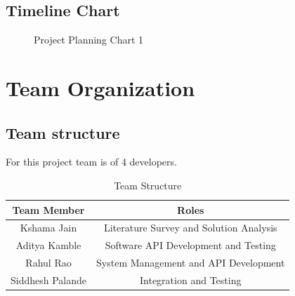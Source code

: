 \documentclass[oneside,a4paper,12pt]{report}
\begin{document}
\pagebreak
\subsection{Timeline Chart}  
\begin{center}
	\begin{figure}[!htbp]
		\centering
	  \caption{Project Planning Chart 1}
	  \label{fig:usecase}
	\end{figure}
\end{center}
 
\section{Team Organization}

\subsection{Team structure}
For this project team is of 4 developers. 
\begin{table}[!htbp]
\begin{center}
\def\arraystretch{1.5}
  \begin{tabular}{| c | c |}
       \hline
       
Team Member & Roles \\ \hline
Kshama Jain & Literature Survey and Solution Analysis \\ \hline
Aditya Kamble & Software API Development and Testing \\ \hline
Rahul Rao & System Management and API Development \\ \hline
Siddhesh Palande & Integration and Testing \\ \hline
       
\end{tabular}
 \caption { Team Structure }
 \label{tab:hreq}
\end{center}

\end{table}
\end{document}
